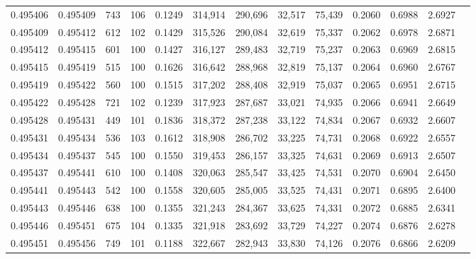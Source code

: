 \begin{tabular}{rrrrrrrrrrrrr}
0.495406 & 0.495409 &   743 & 106 &                                     0.1249 & 314,914 & 290,696 &  32,517 &  75,439 & 0.2060 & 0.6988 & 2.6927 \\
0.495409 & 0.495412 &   612 & 102 &                                     0.1429 & 315,526 & 290,084 &  32,619 &  75,337 & 0.2062 & 0.6978 & 2.6871 \\
0.495412 & 0.495415 &   601 & 100 &                                     0.1427 & 316,127 & 289,483 &  32,719 &  75,237 & 0.2063 & 0.6969 & 2.6815 \\
0.495415 & 0.495419 &   515 & 100 &                                     0.1626 & 316,642 & 288,968 &  32,819 &  75,137 & 0.2064 & 0.6960 & 2.6767 \\
0.495419 & 0.495422 &   560 & 100 &                                     0.1515 & 317,202 & 288,408 &  32,919 &  75,037 & 0.2065 & 0.6951 & 2.6715 \\
0.495422 & 0.495428 &   721 & 102 &                                     0.1239 & 317,923 & 287,687 &  33,021 &  74,935 & 0.2066 & 0.6941 & 2.6649 \\
0.495428 & 0.495431 &   449 & 101 &                                     0.1836 & 318,372 & 287,238 &  33,122 &  74,834 & 0.2067 & 0.6932 & 2.6607 \\
0.495431 & 0.495434 &   536 & 103 &                                     0.1612 & 318,908 & 286,702 &  33,225 &  74,731 & 0.2068 & 0.6922 & 2.6557 \\
0.495434 & 0.495437 &   545 & 100 &                                     0.1550 & 319,453 & 286,157 &  33,325 &  74,631 & 0.2069 & 0.6913 & 2.6507 \\
0.495437 & 0.495441 &   610 & 100 &                                     0.1408 & 320,063 & 285,547 &  33,425 &  74,531 & 0.2070 & 0.6904 & 2.6450 \\
0.495441 & 0.495443 &   542 & 100 &                                     0.1558 & 320,605 & 285,005 &  33,525 &  74,431 & 0.2071 & 0.6895 & 2.6400 \\
0.495443 & 0.495446 &   638 & 100 &                                     0.1355 & 321,243 & 284,367 &  33,625 &  74,331 & 0.2072 & 0.6885 & 2.6341 \\
0.495446 & 0.495451 &   675 & 104 &                                     0.1335 & 321,918 & 283,692 &  33,729 &  74,227 & 0.2074 & 0.6876 & 2.6278 \\
0.495451 & 0.495456 &   749 & 101 &                                     0.1188 & 322,667 & 282,943 &  33,830 &  74,126 & 0.2076 & 0.6866 & 2.6209 \\

\end{tabular}
